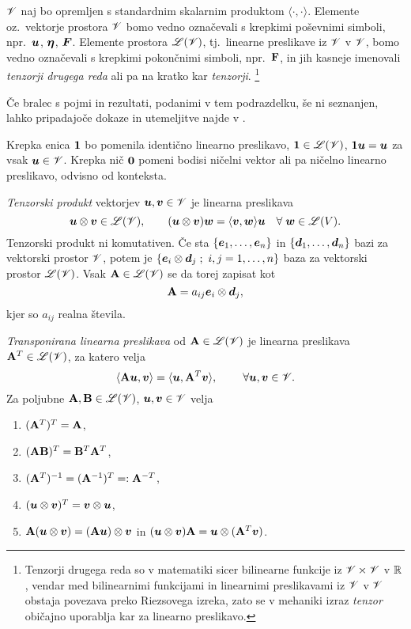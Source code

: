 $\mathscr V$ naj bo opremljen s standardnim skalarnim produktom $\langle\cdot,\cdot\rangle$.
Elemente oz.~vektorje prostora $\mathscr V$ bomo vedno označevali s krepkimi poševni\-mi simboli,
npr.~$\boldsymbol u$, $\boldsymbol \eta$, $\boldsymbol F$. Elemente prostora $\mathscr L(\mathscr V)$, tj.~linearne
preslikave iz $\mathscr V$ v $\mathscr V$, bomo vedno označevali s krepkimi pokončnimi simboli, npr.~$\mathbf F$,
in jih kasneje imenovali \emph{tenzorji drugega reda} ali pa na kratko kar \emph{tenzorji}.
\footnote{Tenzorji drugega reda so v matematiki sicer bilinearne funkcije iz $\mathscr V\times\mathscr V$ v $\mathbb R$, vendar med 
bilinearnimi funkcijami in linearnimi preslikavami iz $\mathscr V$ v $\mathscr V$
obstaja povezava preko Riezsovega izreka, zato se v mehaniki
izraz \textit{tenzor} običajno uporablja kar za linearno preslikavo.}

Če bralec s pojmi in rezultati, podanimi v tem podrazdelku, še ni seznanjen, lahko
pripadajoče dokaze in utemeljitve najde v \cite[str.~233-261]{liu}.

Krepka enica $\mathbf 1$ bo pomenila identično linearno preslikavo, $\mathbf 1\in\mathscr L(\mathscr V)$,
$\mathbf 1\boldsymbol u=\boldsymbol u$ za vsak $\boldsymbol u\in\mathscr V$. Krepka nič $\mathbf 0$ pomeni bodisi
ničelni vektor ali pa ničelno linearno preslikavo, odvisno od konteksta.

\emph{Tenzorski produkt} vektorjev $\boldsymbol u,\boldsymbol v\in\mathscr V$ je linearna preslikava
\[
	\boldsymbol u\otimes\boldsymbol v\in\mathscr L(\mathscr V),\qquad
	(\boldsymbol u\otimes\boldsymbol v)\boldsymbol w=\langle\boldsymbol v,\boldsymbol w\rangle\boldsymbol u\quad\forall\;\boldsymbol w\in\mathscr L(V).
\]
Tenzorski produkt ni komutativen. Če sta $\{\boldsymbol e_1,\dots,\boldsymbol e_n\}$ in
$\{\boldsymbol d_1,\dots,\boldsymbol d_n\}$ bazi za vektorski prostor $\mathscr V$, potem je
$\{\vek{e}_i\otimes\vek{d}_j\;;\ i,j=1,\dots,n\}$ baza za vektorski prostor $\mathscr L(\mathscr V)$.
Vsak $\mathbf A\in\mathscr L(\mathscr V)$ se da torej zapisat kot
\[
	\mathbf A=a_{ij}\boldsymbol e_i\otimes\boldsymbol d_j,
\]
kjer so $a_{ij}$ realna števila.

\emph{Transponirana linearna preslikava} od $\mathbf A\in\mathscr L(\mathscr V)$ je linearna preslikava
$\mathbf A^T\in\mathscr L(\mathscr V)$, za katero velja
\[
	\langle\mathbf A\boldsymbol u,\boldsymbol v\rangle=\langle\boldsymbol u,\mathbf A^T\boldsymbol v\rangle,
	\qquad\;\forall \boldsymbol u,\boldsymbol v\in\mathscr V.
\]
Za poljubne $\mathbf A,\mathbf B\in\mathscr L(\mathscr V)$, $\boldsymbol u,\boldsymbol v\in\mathscr V$ velja
\begin{enumerate}[noitemsep]
	\item $(\mathbf A^T)^T=\mathbf A$,
	\item $(\mathbf A\mathbf B)^T=\mathbf B^T\mathbf A^T$,
	\item $(\mathbf A^T)^{-1}=(\mathbf A^{-1})^T=:\mathbf A^{-T}$,
	\item $(\boldsymbol u\otimes\boldsymbol v)^T=\boldsymbol v\otimes\boldsymbol u$,
	\item $\mathbf A(\boldsymbol u\otimes\boldsymbol v)=(\mathbf A\boldsymbol u)\otimes\boldsymbol v$ in
		$(\boldsymbol u\otimes\boldsymbol v)\mathbf A=\boldsymbol u\otimes(\mathbf A^T\boldsymbol v)$.
\end{enumerate}

